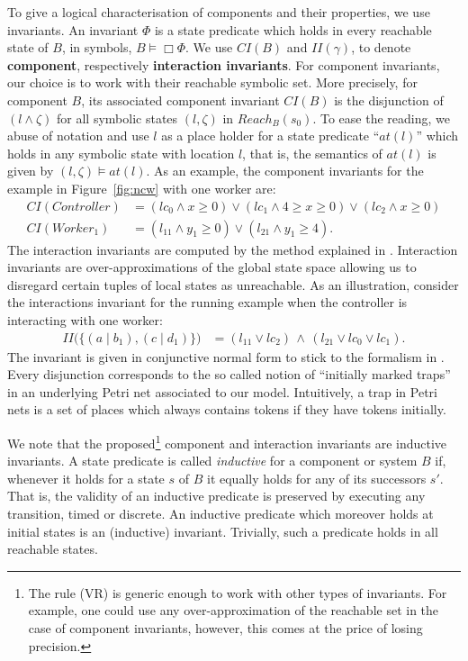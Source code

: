 \documentclass{LMCS}
\newcommand{\reach}{\mathit{Reach}}
\newcommand{\cn}{\mathit{B}\xspace}
\newcommand{\ctn}{\mathit{Controller}}
\newcommand{\cwkO}{\mathit{Worker}_1}
\newcommand{\ic}{\mathit{CI}}
\newcommand{\iim}{\mathit{II}}
\newcommand{\vr}{(VR)}
\theoremstyle{plain}\newtheorem{remark}[thm]{Remark}
\theoremstyle{plain}\newtheorem{example}[thm]{Example}
\begin{document}
To give a logical characterisation of components and their properties, we
use invariants. An invariant $\Phi$ is a state predicate which holds in
every reachable state of $\cn$, in symbols, $B \models \Box \Phi$.  We use
$\ic(\cn)$ and $\iim(\gamma)$, to denote \textbf{component}, respectively
\textbf{interaction invariants}.  For component invariants, our choice is
to work with their reachable symbolic set. More precisely, for component
$\cn$, its associated component invariant $\ic(\cn)$ is the disjunction
of $(l \wedge \zeta)$ for all symbolic states $(l, \zeta)$ in
$\reach_{B}(s_{0})$.  To ease the reading, we abuse of notation and use
$l$ as a place holder for a state predicate ``$\mathit{at}(l)$'' which
holds in any symbolic state with location $l$, that is, the semantics of
$\mathit{at}(l)$ is given by $(l,\zeta) \models \mathit{at}(l)$.  As an
example, the component invariants for the example in Figure~\ref{fig:ncw}
with one worker are:
\begin{align*}
  \ic( \ctn ) & = (lc_0 \wedge x \geq 0) \vee (lc_1 \wedge 4 \geq x \geq 0) \vee (lc_2 \wedge x \geq 0)\\
  \ic( \cwkO )& = (l_{11} \wedge y_1 \geq 0) \vee (l_{21} \wedge y_1 \geq 4).
\end{align*}
The interaction invariants are computed by the method explained in
\cite{dfinder}. Interaction invariants are over-approximations of the
global state space allowing us to disregard certain tuples of local
states as unreachable. As an illustration, consider the interactions
invariant for the running example when the controller is interacting
with one worker:
\begin{align*}
  \iim\big(\{(a\mid b_1), (c \mid d_1)\}\big) & = (l_{11} \vee lc_{2})
  \,\wedge\, (l_{21}\vee lc_{0}\vee lc_{1}).
\end{align*}
The invariant is given in conjunctive normal form to stick to the
formalism in \cite{dfinder, dfinderJ}. Every disjunction corresponds
to the so called notion of ``initially marked traps'' in an underlying
Petri net associated to our model. Intuitively, a trap in Petri nets
is a set of places which always contains tokens if they have tokens
initially.

We note that the proposed\footnote{The rule \vr\; is generic enough to
  work with other types of invariants. For example, one could use any
  over-approximation of the reachable set in the case of component
  invariants, however, this comes at the price of losing precision.}
component and interaction invariants are inductive invariants.  A
state predicate is called {\em inductive} for a component or system
$B$ if, whenever it holds for a state $s$ of $B$ it equally holds for
any of its successors $s'$.  That is, the validity of an inductive
predicate is preserved by executing any transition, timed or discrete.
An inductive predicate which moreover holds at initial states is an
(inductive) invariant.  Trivially, such a predicate holds in all
reachable states.
\end{document}
